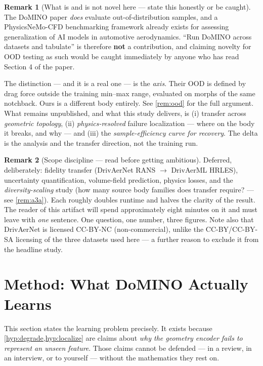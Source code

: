 \documentclass[10pt,a4paper]{article}
\theoremstyle{definition}
\newtheorem{remark}{Remark}[section]
\begin{document}
\begin{remark}[What is and is not novel here --- state this honestly or be caught]
The DoMINO paper \emph{does} evaluate out-of-distribution samples, and a
PhysicsNeMo-CFD benchmarking framework already exists for assessing generalization of
AI models in automotive aerodynamics. ``Run DoMINO across datasets and tabulate'' is
therefore \textbf{not} a contribution, and claiming novelty for OOD testing as such
would be caught immediately by anyone who has read Section 4 of the paper.

The distinction --- and it is a real one --- is the \emph{axis}. Their OOD is defined by
drag force outside the training min--max range, evaluated on morphs of the same
notchback. Ours is a different body entirely. See \cref{rem:ood} for the full argument.
What remains unpublished, and what this study delivers, is (i) transfer across
\emph{geometric topology}, (ii) \emph{physics-resolved} failure localization --- where on
the body it breaks, and why --- and (iii) the \emph{sample-efficiency curve for recovery}.
The delta is the analysis and the transfer direction, not the training run.
\end{remark}

\begin{remark}[Scope discipline --- read before getting ambitious]
\label{rem:scope}
Deferred, deliberately: fidelity transfer (DrivAerNet RANS $\to$ DrivAerML HRLES),
uncertainty quantification, volume-field prediction, physics losses, and the
\emph{diversity-scaling} study (how many source body families does transfer require?
--- see \cref{rem:a3a}). Each roughly doubles runtime and halves the clarity of the
result. The reader of this artifact will spend approximately eight minutes on it and
must leave with \emph{one} sentence. One question, one number, three figures. Note also
that DrivAerNet is licensed CC-BY-NC (non-commercial), unlike the CC-BY/CC-BY-SA
licensing of the three datasets used here --- a further reason to exclude it from the
headline study.
\end{remark}

\section{Method: What DoMINO Actually Learns}
\label{sec:method}

This section states the learning problem precisely. It exists because
\cref{hyp:degrade,hyp:localize} are claims about \emph{why the geometry encoder
fails to represent an unseen feature}. Those claims cannot be defended --- in a
review, in an interview, or to yourself --- without the mathematics they rest on.
\end{document}
